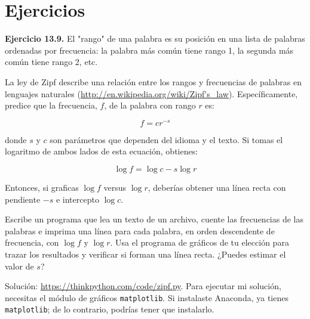 \section{Ejercicios}

\textbf{Ejercicio 13.9.} El "rango" de una palabra es su posición en una lista de palabras ordenadas por frecuencia: la palabra más común tiene rango 1, la segunda más común tiene rango 2, etc.

La ley de Zipf describe una relación entre los rangos y frecuencias de palabras en lenguajes naturales (\url{http://en.wikipedia.org/wiki/Zipf's_law}). Específicamente, predice que la frecuencia, \(f\), de la palabra con rango \(r\) es:

\[f = cr^{-s}\]

donde \(s\) y \(c\) son parámetros que dependen del idioma y el texto. Si tomas el logaritmo de ambos lados de esta ecuación, obtienes:

\[\log f = \log c - s \log r\]

Entonces, si graficas \(\log f\) versus \(\log r\), deberías obtener una línea recta con pendiente \(-s\) e intercepto \(\log c\).

Escribe un programa que lea un texto de un archivo, cuente las frecuencias de las palabras e imprima una línea para cada palabra, en orden descendente de frecuencia, con \(\log f\) y \(\log r\). Usa el programa de gráficos de tu elección para trazar los resultados y verificar si forman una línea recta. ¿Puedes estimar el valor de \(s\)?

Solución: \url{https://thinkpython.com/code/zipf.py}. Para ejecutar mi solución, necesitas el módulo de gráficos \texttt{matplotlib}. Si instalaste Anaconda, ya tienes \texttt{matplotlib}; de lo contrario, podrías tener que instalarlo.